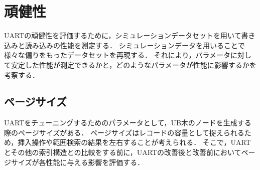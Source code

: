 \section{頑健性}

UARTの頑健性を評価するために，シミュレーションデータセットを用いて書き込みと読み込みの性能を測定する．
シミュレーションデータを用いることで様々な偏りをもったデータセットを再現する．
それにより，パラメータに対して安定した性能が測定できるかと，どのようなパラメータが性能に影響するかを考察する．

\subsection{ページサイズ}

UARTをチューニングするためのパラメータとして，UB木のノードを生成する際のページサイズがある．
ページサイズはレコードの容量として捉えられるため，挿入操作や範囲検索の結果を左右することが考えられる．
そこで，UARTとその他の索引構造との比較をする前に，UARTの改善後と改善前においてページサイズが各性能に与える影響を評価する．

